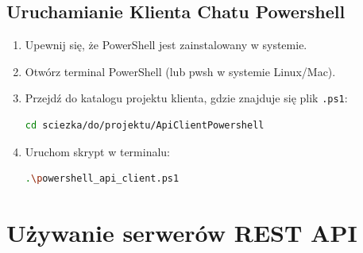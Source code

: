 \subsection{Uruchamianie Klienta Chatu Powershell}
    \begin{enumerate}
        \item Upewnij się, że PowerShell jest zainstalowany w systemie.
        \item Otwórz terminal PowerShell (lub pwsh w systemie Linux/Mac).
        \item Przejdź do katalogu projektu klienta, gdzie znajduje się plik \texttt{.ps1}:
        \begin{lstlisting}[language=bash]
    cd sciezka/do/projektu/ApiClientPowershell
        \end{lstlisting}
        \item Uruchom skrypt w terminalu:
        \begin{lstlisting}[language=bash]
    .\powershell_api_client.ps1
        \end{lstlisting}
    \end{enumerate}

\section{Używanie serwerów REST API}

